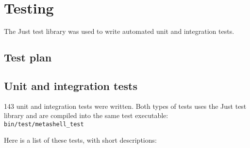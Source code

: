 
\chapter{Testing}

The Just\cite{just} test library was used to write automated unit and
integration tests.


\section{Test plan}


\section{Unit and integration tests}

143 unit and integration tests were written. Both types of tests uses the Just
test library and are compiled into the same test executable:
\verb$bin/test/metashell_test$

Here is a list of these tests, with short descriptions:

